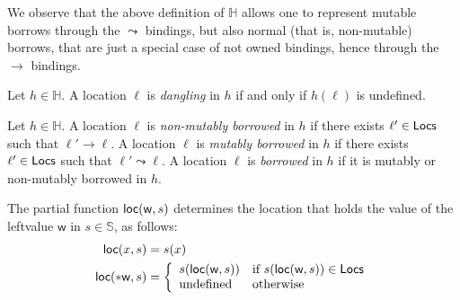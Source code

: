 \noindent
We observe that the above definition of $\mathbb{H}$ allows one to represent mutable borrows
through the $\leadsto$ bindings, but also normal (that is, non-mutable) borrows, that are
just a special case of not owned bindings, hence through the $\to$ bindings.

\begin{definition}
  Let $h\in\mathbb{H}$. A location $\ell$ is \emph{dangling} in $h$ if
  and only if $h(\ell)$ is undefined.
\end{definition}

\begin{definition}
  Let $h\in\mathbb{H}$. %
  A location $\ell$ is \emph{non-mutably borrowed} in $h$
  if there exists $\ell'\in\mathsf{Locs}$ such that $\ell'\to\ell$.
  A location $\ell$ is \emph{mutably borrowed} in $h$
  if there exists $\ell'\in\mathsf{Locs}$ such that $\ell'\leadsto\ell$.
  A location $\ell$ is \emph{borrowed} in $h$
  if it is mutably or non-mutably borrowed in $h$.
\end{definition}


\begin{definition}[Locate]\label{def:locate}
  The partial function $\mathsf{loc}(\mathsf{w},s)$ determines the location that holds
  the value of the leftvalue $\mathsf{w}$ in $s\in\mathbb{S}$, as follows:
  \begin{align*}
    \mathsf{loc}(x,s) &= s(x)\\
    \mathsf{loc}(*\mathsf{w},s) &= \left\{\begin{array}{ll}
      s(\mathsf{loc}(\mathsf{w},s)) & \text{if } s(\mathsf{loc}(\mathsf{w},s)) \in \mathsf{Locs}\\
      \text{undefined} & \text{otherwise}
    \end{array}\right.
  \end{align*}
\end{definition}

